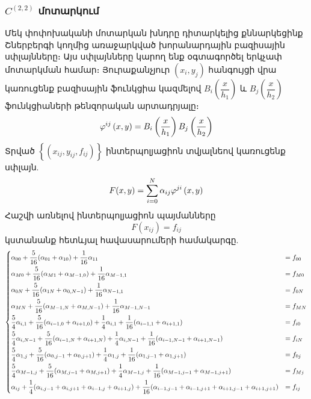 \documentclass[fleqn, bachelor,subf,12pt,notitlepage]{article}
\begin{document}
\subsubsection*{$C^{(2,2)}$ մոտարկում}
Մեկ փոփոխականի մոտարկան խնդրը դիտարկելից քննարկեցինք Շներբերգի կողմից առաջարկված խորանարդային բազիսային սփլայնները։ Այս սփլայնները կարող ենք  օգտագործել երկչափ մոտարկման համար։
Յուրաքանչյուր $\left(x_{i}, y_{j}\right)$ հանգույցի վրա կառուցենք բազիսային ֆունկցիա կազմելով $B_{i}\left(\dfrac{x}{h_{1}}\right)$ և $B_{j}\left(\dfrac{x}{h_{2}}\right)$ ֆունկցիաների թենզորական  արտադրյալը։
\begin{equation}
\varphi^{ij}\left(x, y\right) = B_{i}\left(\dfrac{x}{h_{1}}\right) B_{j}\left(\dfrac{x}{h_{2}}\right)$$
\end{equation}
\noindent Տրված $\left\{\left(x_{ij}, y_{ij}, f_{ij}\right)\right\}$ ինտերպոլյացիոն տվյալնեով կառուցենք սփլայն.
\begin{equation}
F(x,y) = \sum_{i=0}^{N} \alpha_{ij}\varphi^{ji}\left(x, y\right)$$
\end{equation}
Հաշվի առնելով ինտերպոլյացիոն պայմանները
\begin{equation*}
F(x_{ij}) = f_{ij}
\end{equation*}
կստանանք հետևյալ հավասարումերի համակարգը.
\begin{equation}
\begin{dcases}
\alpha_{00}+\frac{5}{16}(\alpha_{01} + \alpha_{10}) +\frac{1}{16}\alpha_{11} &= f_{00}\\
\alpha_{M0}+\frac{5}{16}(\alpha_{M1} + \alpha_{M-1,0}) +\frac{1}{16}\alpha_{M-1, 1} &= f_{M0}\\
\alpha_{0N}+\frac{5}{16}(\alpha_{1N} + \alpha_{0,N-1}) +\frac{1}{16}\alpha_{N-1, 1} &= f_{0N}\\
\alpha_{MN}+\frac{5}{16}(\alpha_{M-1,N} + \alpha_{M,N-1}) +\frac{1}{16}\alpha_{M-1,N-1} &= f_{MN}\\
\frac{5}{4}\alpha_{i,1}+\frac{5}{16}(\alpha_{i-1,0} + \alpha_{i+1,0}) +\frac{1}{4}\alpha_{i,1} + \frac{1}{16}(\alpha_{i-1,1}+\alpha_{i+1,1}) &= f_{i0}\\
\frac{5}{4}\alpha_{i,N-1}+\frac{5}{16}(\alpha_{i-1,N} + \alpha_{i+1,N}) +\frac{1}{4}\alpha_{i,N-1} + \frac{1}{16}(\alpha_{i-1,N-1}+\alpha_{i+1,N-1}) &= f_{iN}\\
\frac{5}{4}\alpha_{1,j}+\frac{5}{16}(\alpha_{0,j-1} + \alpha_{0,j+1}) +\frac{1}{4}\alpha_{1,j} + \frac{1}{16}(\alpha_{1,j-1}+\alpha_{1,j+1}) &= f_{0j}\\
\frac{5}{4}\alpha_{M-1,j}+\frac{5}{16}(\alpha_{M,j-1} + \alpha_{M,j+1}) +\frac{1}{4}\alpha_{M-1,j} + \frac{1}{16}(\alpha_{M-1,j-1}+\alpha_{M-1,j+1})& = f_{Mj}\\
\alpha_{ij} + \frac{1}{4}(\alpha_{i,j-1} + \alpha_{i,j+1} + \alpha_{i-1,j} + \alpha_{i+1,j}) + \frac{1}{16}(\alpha_{i-1,j-1} + \alpha_{i-1,j+1} + \alpha_{i+1,j-1} +\alpha_{i+1,j+1}) &= f_{ij}
\end{dcases}
\end{equation}
\end{document}
